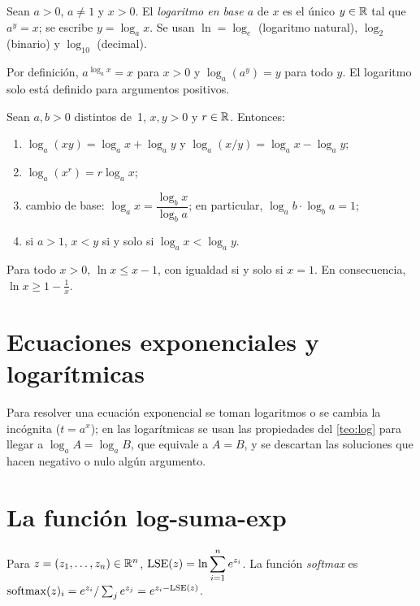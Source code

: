 \begin{definicion}[Logaritmo]\label{def:log}
Sean $a>0$, $a\neq1$ y $x>0$. El \emph{logaritmo en base $a$} de $x$ es el único $y\in\mathbb{R}$ tal que $a^y=x$; se escribe $y=\log_ax$. Se usan $\ln=\log_e$ (logaritmo natural), $\log_2$ (binario) y $\log_{10}$ (decimal).
\end{definicion}

Por definición, $a^{\log_ax}=x$ para $x>0$ y $\log_a(a^y)=y$ para todo $y$. El logaritmo solo está definido para argumentos positivos.

\begin{teorema}\label{teo:log}
Sean $a,b>0$ distintos de~1, $x,y>0$ y $r\in\mathbb{R}$. Entonces:
\begin{enumerate}
  \item $\log_a(xy)=\log_ax+\log_ay$ y $\log_a(x/y)=\log_ax-\log_ay$;
  \item $\log_a(x^r)=r\log_ax$;
  \item cambio de base: $\log_ax=\dfrac{\log_bx}{\log_ba}$; en particular, $\log_ab\cdot\log_ba=1$;
  \item si $a>1$, $x<y$ si y solo si $\log_ax<\log_ay$.
\end{enumerate}
\end{teorema}

\begin{corolario}\label{cor:lnx}
Para todo $x>0$, $\ln x\le x-1$, con igualdad si y solo si $x=1$. En consecuencia, $\ln x\ge1-\frac1x$.
\end{corolario}

\section{Ecuaciones exponenciales y logarítmicas}

Para resolver una ecuación exponencial se toman logaritmos o se cambia la incógnita ($t=a^x$); en las logarítmicas se usan las propiedades del \cref{teo:log} para llegar a $\log_aA=\log_aB$, que equivale a $A=B$, y se descartan las soluciones que hacen negativo o nulo algún argumento.

\addtocounter{definicion}{1}%

\addtocounter{definicion}{1}%

\section{La función log-suma-exp}

\begin{definicion}\label{def:lse}
Para $z=(z_1,\dots,z_n)\in\mathbb{R}^n$, $\displaystyle\operatorname{LSE}(z)=\ln\sum_{i=1}^ne^{z_i}$. La función \emph{softmax} es $\operatorname{softmax}(z)_i=e^{z_i}/\sum_je^{z_j}=e^{z_i-\operatorname{LSE}(z)}$.
\end{definicion}

